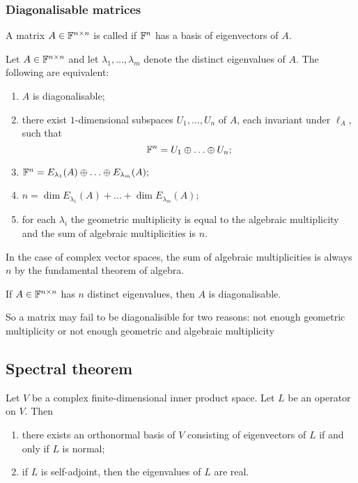 \subsubsection{Diagonalisable matrices}
\begin{definition}
A matrix $A\in\mathbb{F}^{n\times n}$ is called  if $\mathbb{F}^n$ has a basis of eigenvectors of $A$.
\end{definition}
\begin{proposition}
Let $A\in\mathbb{F}^{n\times n}$ and let $\lambda_1,\ldots, \lambda_m$ denote the distinct eigenvalues of $A$. The following are equivalent:
\begin{enumerate}
\item $A$ is diagonalisable;
\item there exist $1$-dimensional subspaces $U_1,\ldots, U_n$ of $A$, each invariant under $\ell_A$, such that
\[ \mathbb{F}^n = U_1\oplus \ldots \oplus U_n; \]
\item $\mathbb{F}^n = E_{\lambda_1}(A) \oplus \ldots \oplus E_{\lambda_m}(A);$
\item $n = \dim E_{\lambda_1}(A) + \ldots + \dim E_{\lambda_m}(A);$
\item for each $\lambda_i$ the geometric multiplicity is equal to the algebraic multiplicity and the sum of algebraic multiplicities is $n$.
\end{enumerate}
\end{proposition}
In the case of complex vector spaces, the sum of algebraic multiplicities is always $n$ by the fundamental theorem of algebra.
\begin{corollary}
If $A\in\mathbb{F}^{n\times n}$ has $n$ distinct eigenvalues, then $A$ is diagonalisable.
\end{corollary}
So a matrix may fail to be diagonalisible for two reasons: not enough geometric multiplicity or not enough geometric and algebraic multiplicity

\subsection{Spectral theorem}
\begin{theorem}
Let $V$ be a complex finite-dimensional inner product space. Let $L$ be an operator on $V$. Then
\begin{enumerate}
\item there exists an orthonormal basis of $V$ consisting of eigenvectors of $L$ \textup{if and only if} $L$ is normal;
\item if $L$ is self-adjoint, then the eigenvalues of $L$ are real.
\end{enumerate}
\end{theorem}

